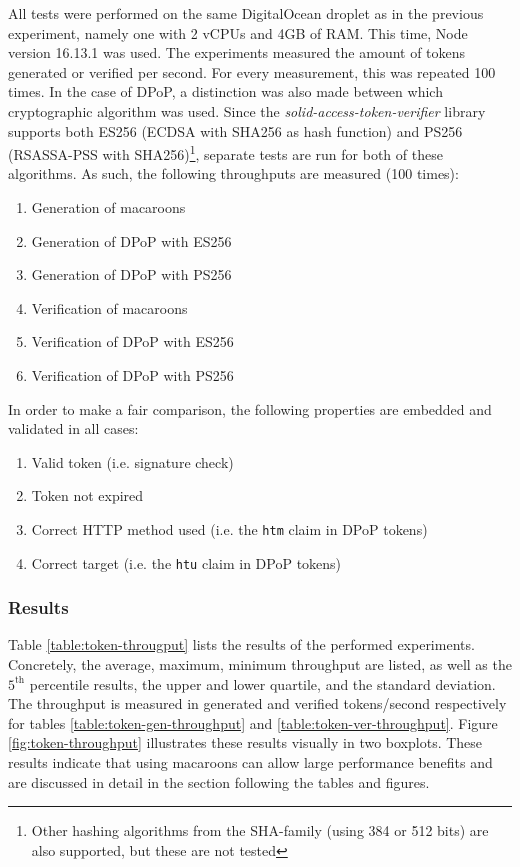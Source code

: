 All tests were performed on the same DigitalOcean droplet as in the previous experiment, namely one with 2 vCPUs and 4GB of RAM. This time, Node version 16.13.1 was used. The experiments measured the amount of tokens generated or verified per second. For every measurement, this was repeated 100 times. In the case of \gls{DPoP}, a distinction was also made between which cryptographic algorithm was used. Since the  \textit{solid-access-token-verifier} library supports both ES256 (ECDSA with SHA256 as hash function) and PS256 (RSASSA-PSS with SHA256)\footnote{Other hashing algorithms from the SHA-family (using 384 or 512 bits) are also supported, but these are not tested}, separate tests are run for both of these algorithms. As such, the following throughputs are measured (100 times):
\begin{enumerate}
    \item Generation of macaroons
    \item Generation of \gls{DPoP} with ES256
    \item Generation of \gls{DPoP} with PS256
    \item Verification of macaroons
    \item Verification of \gls{DPoP} with ES256
    \item Verification of \gls{DPoP} with PS256
\end{enumerate}

\noindent In order to make a fair comparison, the following properties are embedded and validated in all cases:
\begin{enumerate}
    \item Valid token (i.e. signature check)
    \item Token not expired
    \item Correct HTTP method used (i.e. the \texttt{htm} claim in \gls{DPoP} tokens)
    \item Correct target (i.e. the \texttt{htu} claim in \gls{DPoP} tokens)
\end{enumerate}

\subsubsection{Results}
Table \ref{table:token-througput} lists the results of the performed experiments. Concretely, the average, maximum, minimum throughput are listed, as well as the $5^{\text{th}}$ percentile results, the upper and lower quartile, and the standard deviation. The throughput is measured in generated and verified tokens/second respectively for tables \ref{table:token-gen-throughput} and \ref{table:token-ver-throughput}. Figure \ref{fig:token-throughput} illustrates these results visually in two boxplots. These results indicate that using macaroons can allow large performance benefits and are discussed in detail in the section following the tables and figures.



